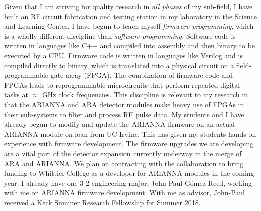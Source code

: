 \documentclass[../../main.tex]{subfiles}
\begin{document}
Given that I am striving for quality research in \textit{all phases} of my sub-field, I have built an RF circuit fabrication and testing station in my laboratory in the Science and Learning Center.  I have begun to teach myself \textit{firmware programming}, which is a wholly different discipline than \textit{software programming.}  Software code is written in languages like C++ and compiled into assembly and then binary to be executed by a CPU.  Firmware code is written in languages like Verilog and is compiled directly to binary, which is translated into a physical circuit on a field-programmable gate array (FPGA).  The combination of firmware code and FPGAs leads to reprogrammable microcircuits that perform repeated digital tasks at $\approx$ GHz clock frequencies.  This discipline is relevant to my research in that the ARIANNA and ARA detector modules make heavy use of FPGAs in their sub-systems to filter and process RF pulse data.  My students and I have already begun to modify and update the ARIANNA firmware on an actual ARIANNA module on-loan from UC Irvine.  This has given my students hands-on experience with firmware development.  The firmware upgrades we are developing are a vital part of the detector expansion currently underway in the merge of ARA and ARIANNA.  We plan on contracting with the collaboration to bring funding to Whittier College as a developer for ARIANNA modules in the coming year.  I already have one 3-2 engineering major, John-Paul G\'{o}mez-Reed, working with me on ARIANNA firmware development.  With me as advisor, John-Paul received a Keck Summer Research Fellowship for Summer 2018.
\end{document}
